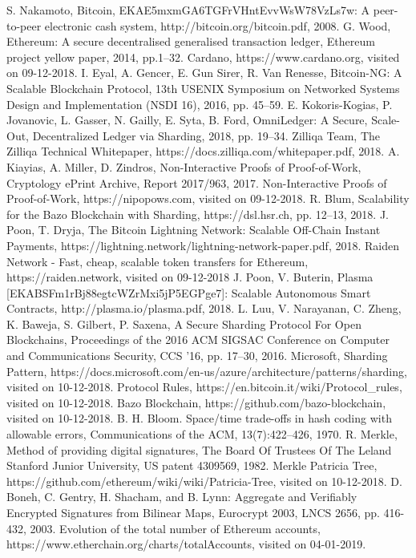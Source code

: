 \documentclass[conference]{IEEEtran}
\begin{document}
\begin{thebibliography}{00}
 S. Nakamoto, Bitcoin, EKAE5mxmGA6TGFrVHntEvvWsW78VzLs7w: A peer-to-peer electronic cash system, http://bitcoin.org/bitcoin.pdf, 2008.
 G. Wood, Ethereum: A secure decentralised generalised transaction ledger, Ethereum project yellow paper, 2014, pp.1--32.
 Cardano, https://www.cardano.org, visited on 09-12-2018.
 I. Eyal, A. Gencer, E. Gun Sirer, R. Van Renesse, Bitcoin-NG: A Scalable Blockchain Protocol, 13th {USENIX} Symposium on Networked Systems Design and Implementation ({NSDI} 16), 2016, pp. 45--59.
 E. Kokoris-Kogias, P. Jovanovic, L. Gasser, N. Gailly, E. Syta, B. Ford, OmniLedger: A Secure, Scale-Out, Decentralized Ledger via Sharding, 2018, pp. 19--34.
 Zilliqa Team, The Zilliqa Technical Whitepaper, https://docs.zilliqa.com/whitepaper.pdf, 2018.
 A. Kiayias, A. Miller, D. Zindros, Non-Interactive Proofs of Proof-of-Work, Cryptology ePrint Archive, Report 2017/963, 2017.
 Non-Interactive Proofs of Proof-of-Work, https://nipopows.com, visited on 09-12-2018.
 R. Blum, Scalability for the Bazo Blockchain with Sharding, https://dsl.hsr.ch, pp. 12--13, 2018.
 J. Poon, T. Dryja, The Bitcoin Lightning Network: Scalable Off-Chain Instant Payments, https://lightning.network/lightning-network-paper.pdf, 2018.
 Raiden Network - Fast, cheap, scalable token transfers for Ethereum, https://raiden.network, visited on 09-12-2018
 J. Poon, V. Buterin, Plasma [EKABSFm1rBj88egtcWZrMxi5jP5EGPge7]: Scalable Autonomous Smart Contracts, http://plasma.io/plasma.pdf, 2018.
 L. Luu, V. Narayanan, C. Zheng, K. Baweja, S. Gilbert, P. Saxena, A Secure Sharding Protocol For Open Blockchains, Proceedings of the 2016 ACM SIGSAC Conference on Computer and Communications Security, CCS '16, pp. 17--30, 2016.
 Microsoft, Sharding Pattern, https://docs.microsoft.com/en-us/azure/architecture/patterns/sharding, visited on 10-12-2018.
 Protocol Rules, https://en.bitcoin.it/wiki/Protocol\_rules, visited on 10-12-2018.
 Bazo Blockchain, https://github.com/bazo-blockchain, visited on 10-12-2018.
 B. H. Bloom. Space/time trade-offs in hash coding with allowable errors, Communications of the ACM, 13(7):422–426, 1970.
 R. Merkle, Method of providing digital signatures, The Board Of Trustees Of The Leland Stanford Junior University, US patent 4309569, 1982.
 Merkle Patricia Tree, https://github.com/ethereum/wiki/wiki/Patricia-Tree, visited on 10-12-2018.
 D. Boneh, C. Gentry, H. Shacham, and B. Lynn: Aggregate and Verifiably Encrypted Signatures from Bilinear Maps, Eurocrypt 2003, LNCS 2656, pp. 416-432, 2003.
 Evolution of the total number of Ethereum accounts, https://www.etherchain.org/charts/totalAccounts, visited on 04-01-2019.

\end{thebibliography}
\end{document}
